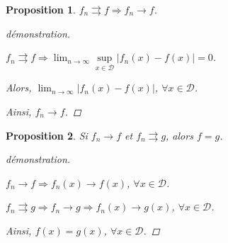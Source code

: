 \documentclass{report}
\newcommand*{\dlim}[3]{\displaystyle\lim_{#1 \to #2}#3}
\newcommand*{\abs}[1]{\left| #1 \right|}
\newcommand*{\convabs}{\rightrightarrows}
\newtheorem*{prop}{Proposition}
\theoremstyle{definition}
\theoremstyle{remark}
\begin{document}
	\begin{prop}
		$f_n \convabs f \Rightarrow f_n \to f$.
		\begin{proof}[d\'emonstration]~

			$f_n \convabs f \Rightarrow \dlim{n}{\infty}{\sup\limits_{x \in \mathcal{D}}\abs{f_n(x)-f(x)}}=0$.

			Alors, $\dlim{n}{\infty}{\abs{f_n(x)-f(x)}}$, $\forall x \in \mathcal{D}$.

			Ainsi, $f_n \to f$.
		\end{proof}
	\end{prop}
	\begin{prop}
		Si $f_n \to f$ et $f_n \convabs g$, alors $f=g$.
		\begin{proof}[d\'emonstration]~

			$f_n \to f \Rightarrow f_n(x) \to f(x)$, $\forall x \in \mathcal{D}$.

			$f_n \convabs g \Rightarrow f_n \to g \Rightarrow f_n(x) \to g(x)$, $\forall x \in \mathcal{D}$.

			Ainsi, $f(x)=g(x)$, $\forall x \in \mathcal{D}$.
		\end{proof}
	\end{prop}
\end{document}
